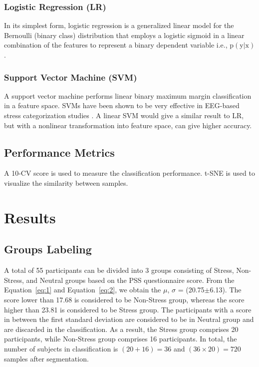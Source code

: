 \documentclass[pdflatex,sn-mathphys]{sn-jnl}%
\theoremstyle{thmstyleone}%
\theoremstyle{thmstyletwo}%
\theoremstyle{thmstylethree}%
\begin{document}
\subsubsection{Logistic Regression (LR)}
In its simplest form, logistic regression is a generalized linear model for the Bernoulli (binary class) distribution that employs a logistic sigmoid in a linear combination of the features to represent a binary dependent variable i.e., $ \text{p} ( \text{y} \vert \text{x} ) $.

\subsubsection{Support Vector Machine (SVM)}

A support vector machine performs linear binary maximum margin classification in a feature space. SVMs have been shown to be very effective in EEG-based stress categorization studies \cite{Alshargie-2018, Subhani-2017}. A linear SVM would give a similar result to LR, but with a nonlinear transformation into feature space, can give higher accuracy.


\subsection{Performance Metrics}\label{subsec5}

A 10-CV score is used to measure the classification performance. t-SNE is used to visualize the similarity between samples. 

\section{Results}\label{sec4}

\subsection{Groups Labeling} \label{subsec6}
A total of 55 participants can be divided into 3 groups consisting of Stress, Non-Stress, and Neutral groups based on the PSS questionnaire score. From the Equation~\ref{eq:1} and Equation~\ref{eq:2}, we obtain the $\mu$, $\sigma$ = (20.75$\pm$6.13). The score lower than 17.68 is considered to be Non-Stress group, whereas the score higher than 23.81 is considered to be Stress group. The participants with a score in between the first standard deviation are considered to be in Neutral group and are discarded in the classification. As a result, the Stress group comprises 20 participants, while Non-Stress group comprises 16 participants. In total, the number of subjects in classification is $(20 + 16) = 36$ and $(36 \times 20) = 720$ samples after segmentation.
\end{document}
